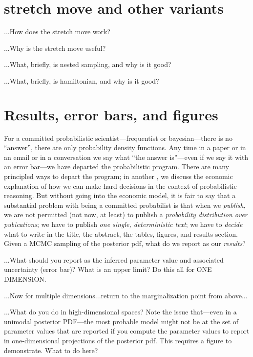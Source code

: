 \documentclass[12pt,twoside,pdftex]{article}
\begin{document}
\section{stretch move and other variants}

...How does the stretch move work?

...Why is the stretch move useful?

...What, briefly, is nested sampling, and why is it good?

...What, briefly, is hamiltonian, and why is it good?

\section{Results, error bars, and figures}

For a committed probabilistic scientist---frequentist or
bayesian---there is no ``answer'', there are only probability density
functions.  Any time in a paper or in an email or in a conversation
we say what ``the answer is''---even if we say it with an error
bar---we have departed the probabilistic program.  There are many
principled ways to depart the program; in another \documentname, we
discuss the economic explanation of how we can make hard decisions in
the context of probabilistic reasoning.
But without going into the economic model, it is fair to say that a
substantial problem with being a committed probabilist is that when we
\emph{publish}, we are not permitted (not now, at least) to publish a
\emph{probability distribution over pubications}; we have to publish
\emph{one single, deterministic text}; we have to \emph{decide} what
to write in the title, the abstract, the tables, figures, and results
section.  Given a MCMC sampling of the posterior pdf, what do we
report as our \emph{results}?

...What should you report as the inferred parameter value and
associated uncertainty (error bar)?  What is an upper limit?  Do this
all for ONE DIMENSION.

...Now for multiple dimensions...return to the marginalization point
from above...

...What do you do in high-dimensional spaces?  Note the issue
that---even in a unimodal posterior PDF---the most probable model
might not be at the set of parameter values that are reported if you
compute the parameter values to report in one-dimensional projections
of the posterior pdf.  This requires a figure to demonstrate.  What to
do here?
\end{document}
